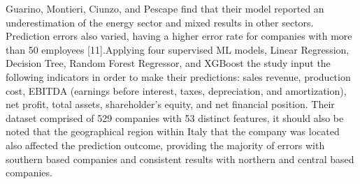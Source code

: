 \documentclass[12pt]{article}
\begin{document}
        Guarino, Montieri, Ciunzo, and Pescape find that their model reported an underestimation of the energy sector and mixed results in other sectors. Prediction errors also varied, having a higher error rate for companies with more than 50 employees [11].Applying four supervised ML models, Linear Regression, Decision Tree, Random Forest Regressor, and XGBoost the study input the following indicators in order to make their predictions: sales revenue, production cost, EBITDA (earnings before interest, taxes, depreciation, and amortization), net profit, total assets, shareholder's equity, and net financial position. Their dataset comprised of 529 companies with 53 distinct features, it should also be noted that the geographical region within Italy that the company was located also affected the prediction outcome, providing the majority of errors with southern based companies and consistent results with northern and central based companies.

\newpage


\end{document}
